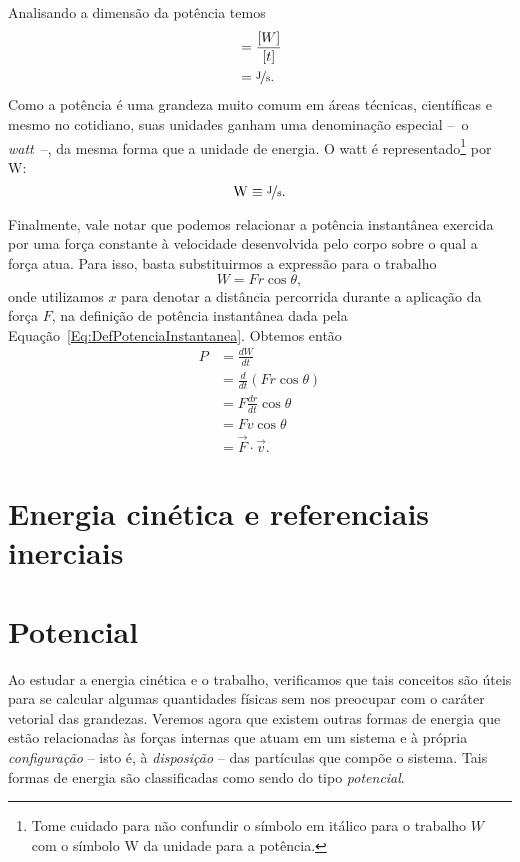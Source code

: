 Analisando a dimensão da potência temos
\begin{align}
  [P] &= \frac{[W]}{[t]} \\
  &= \nicefrac{\rm{J}}{\rm{s}}.
\end{align}
%
Como a potência é uma grandeza muito comum em áreas técnicas, científicas e mesmo no cotidiano, suas unidades ganham uma denominação especial --~o \emph{watt}~--, da mesma forma que a unidade de energia. O watt é representado\footnote{Tome cuidado para não confundir o símbolo em itálico para o trabalho $W$ com o símbolo W da unidade para a potência.} por W:
\begin{equation}
  \rm{W} \equiv \nicefrac{\rm{J}}{\rm{s}}.
\end{equation}

Finalmente, vale notar que podemos relacionar a potência instantânea exercida por uma força constante à velocidade desenvolvida pelo corpo sobre o qual a força atua. Para isso, basta substituirmos a expressão para o trabalho
\begin{equation}
  W = F r \cos \theta,
\end{equation}
%
onde utilizamos $x$ para denotar a distância percorrida durante a aplicação da força $F$, na definição de potência instantânea dada pela Equação~\ref{Eq:DefPotenciaInstantanea}. Obtemos então
\begin{align}
  P &= \frac{dW}{dt} \\
  &= \frac{d}{dt}(Fr\cos\theta) \\
  &= F\frac{dr}{dt} \cos\theta\\
  &= F v \cos\theta \\
  &= \vec{F}\cdot\vec{v}.
\end{align}


\section{Energia cinética e referenciais inerciais}

\section{Potencial}

Ao estudar a energia cinética e o trabalho, verificamos que tais conceitos são úteis para se calcular algumas quantidades físicas sem nos preocupar com o caráter vetorial das grandezas. Veremos agora que existem outras formas de energia que estão relacionadas às forças internas que atuam em um sistema e à própria \emph{configuração} -- isto é, à \emph{disposição} -- das partículas que compõe o sistema. Tais formas de energia são classificadas como sendo do tipo \emph{potencial}.


